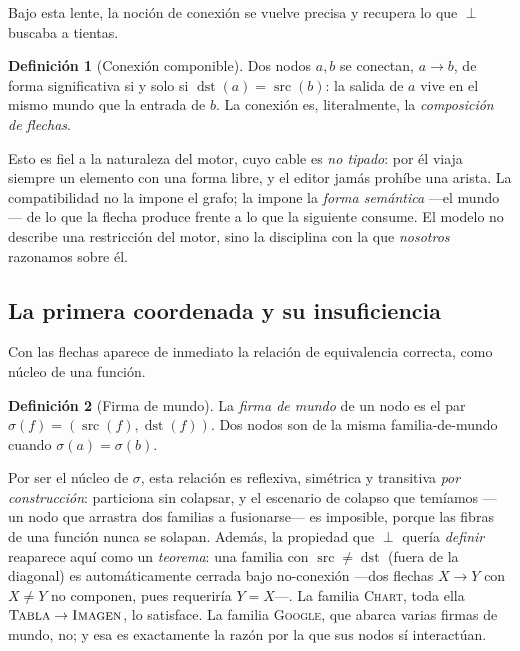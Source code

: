 \documentclass[11pt,a4paper]{article}
\theoremstyle{definition}
\newtheorem{definicion}{Definición}[section]
\theoremstyle{plain}
\newcommand{\mundo}[1]{\textsc{#1}}   %
\begin{document}
Bajo esta lente, la noción de conexión se vuelve precisa y recupera lo que $\perp$
buscaba a tientas.

\begin{definicion}[Conexión componible]
Dos nodos $a,b$ se conectan, $a \to b$, de forma significativa si y solo si
$\operatorname{dst}(a) = \operatorname{src}(b)$: la salida de $a$ vive en el mismo
mundo que la entrada de $b$. La conexión es, literalmente, la \emph{composición de
flechas}.
\end{definicion}

Esto es fiel a la naturaleza del motor, cuyo cable es \emph{no tipado}: por él viaja
siempre un elemento con una forma libre, y el editor jamás prohíbe una arista. La
compatibilidad no la impone el grafo; la impone la \emph{forma semántica} ---el
mundo--- de lo que la flecha produce frente a lo que la siguiente consume. El modelo
no describe una restricción del motor, sino la disciplina con la que \emph{nosotros}
razonamos sobre él.

\subsection{La primera coordenada y su insuficiencia}

Con las flechas aparece de inmediato la relación de equivalencia correcta, como
núcleo de una función.

\begin{definicion}[Firma de mundo]
La \emph{firma de mundo} de un nodo es el par
$\sigma(f) = (\operatorname{src}(f), \operatorname{dst}(f))$. Dos nodos son de la
misma familia-de-mundo cuando $\sigma(a)=\sigma(b)$.
\end{definicion}

Por ser el núcleo de $\sigma$, esta relación es reflexiva, simétrica y transitiva
\emph{por construcción}: particiona sin colapsar, y el escenario de colapso que
temíamos ---un nodo que arrastra dos familias a fusionarse--- es imposible, porque
las fibras de una función nunca se solapan. Además, la propiedad que $\perp$ quería
\emph{definir} reaparece aquí como un \emph{teorema}: una familia con
$\operatorname{src}\neq\operatorname{dst}$ (fuera de la diagonal) es automáticamente
cerrada bajo no-conexión ---dos flechas $X\to Y$ con $X\neq Y$ no componen, pues
requeriría $Y=X$---. La familia \mundo{Chart}, toda ella $\mundo{Tabla}\to\mundo{Imagen}$,
lo satisface. La familia \mundo{Google}, que abarca varias firmas de mundo, no; y
esa es exactamente la razón por la que sus nodos sí interactúan.
\end{document}
